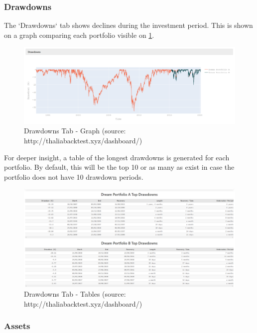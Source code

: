 \documentclass[main.tex]{subfiles}
\begin{document}
\subsubsection{Drawdowns}

The `Drawdowns` tab shows declines during the investment period. This is shown on a graph comparing each portfolio visible on \figurename{\ref{drawdowns_graph}}.

\begin{figure}[H]
   \centering
   \includegraphics[width=\textwidth]{08Appendices/081User/081Pictures/drawdowns_graph.png}
   \caption{Drawdowns Tab - Graph (source: http://thaliabacktest.xyz/dashboard/)}
   \label{drawdowns_graph}
\end{figure}

For deeper insight, a table of the longest drawdowns is generated for each portfolio. By default, this will be the top 10 or as many as exist in case the portfolio does not have 10 drawdown periods.

\begin{figure}[H]
   \centering
   \includegraphics[width=\textwidth]{08Appendices/081User/081Pictures/drawdowns_tables.png}
   \caption{Drawdowns Tab - Tables (source: http://thaliabacktest.xyz/dashboard/)}
   \label{drawdowns_table}
\end{figure}



\subsubsection{Assets}
\end{document}
